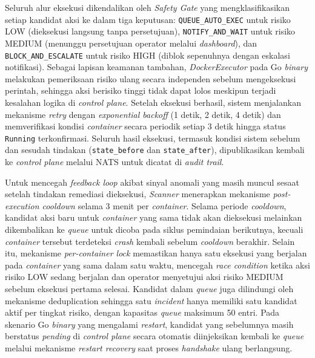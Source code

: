 Seluruh alur eksekusi dikendalikan oleh \textit{Safety Gate} yang mengklasifikasikan setiap kandidat aksi ke dalam tiga keputusan: \texttt{QUEUE\_AUTO\_EXEC} untuk risiko LOW (dieksekusi langsung tanpa persetujuan), \texttt{NOTIFY\_AND\_WAIT} untuk risiko MEDIUM (menunggu persetujuan operator melalui \textit{dashboard}), dan \texttt{BLOCK\_AND\_ESCALATE} untuk risiko HIGH (diblok sepenuhnya dengan eskalasi notifikasi). Sebagai lapisan keamanan tambahan, \textit{DockerExecutor} pada Go \textit{binary} melakukan pemeriksaan risiko ulang secara independen sebelum mengeksekusi perintah, sehingga aksi berisiko tinggi tidak dapat lolos meskipun terjadi kesalahan logika di \textit{control plane}. Setelah eksekusi berhasil, sistem menjalankan mekanisme \textit{retry} dengan \textit{exponential backoff} (1 detik, 2 detik, 4 detik) dan memverifikasi kondisi \textit{container} secara periodik setiap 3 detik hingga status \texttt{Running} terkonfirmasi. Seluruh hasil eksekusi, termasuk kondisi sistem sebelum dan sesudah tindakan (\texttt{state\_before} dan \texttt{state\_after}), dipublikasikan kembali ke \textit{control plane} melalui NATS untuk dicatat di \textit{audit trail}.

Untuk mencegah \textit{feedback loop} akibat sinyal anomali yang masih muncul sesaat setelah tindakan remediasi dieksekusi, \textit{Scanner} menerapkan mekanisme \textit{post-execution cooldown} selama 3 menit per \textit{container}. Selama periode \textit{cooldown}, kandidat aksi baru untuk \textit{container} yang sama tidak akan dieksekusi melainkan dikembalikan ke \textit{queue} untuk dicoba pada siklus pemindaian berikutnya, kecuali \textit{container} tersebut terdeteksi \textit{crash} kembali sebelum \textit{cooldown} berakhir. Selain itu, mekanisme \textit{per-container lock} memastikan hanya satu eksekusi yang berjalan pada \textit{container} yang sama dalam satu waktu, mencegah \textit{race condition} ketika aksi risiko LOW sedang berjalan dan operator menyetujui aksi risiko MEDIUM sebelum eksekusi pertama selesai. Kandidat dalam \textit{queue} juga dilindungi oleh mekanisme deduplication sehingga satu \textit{incident} hanya memiliki satu kandidat aktif per tingkat risiko, dengan kapasitas \textit{queue} maksimum 50 entri. Pada skenario Go \textit{binary} yang mengalami \textit{restart}, kandidat yang sebelumnya masih berstatus \textit{pending} di \textit{control plane} secara otomatis diinjeksikan kembali ke \textit{queue} melalui mekanisme \textit{restart recovery} saat proses \textit{handshake} ulang berlangsung.

